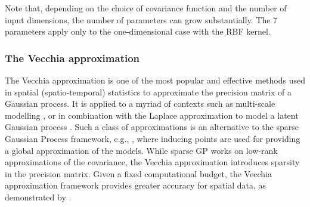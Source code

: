 \documentclass[12pt]{article}
\begin{document}
\noindent
\hangindent=-5mm
Note that, depending on the choice of covariance function and the number of input dimensions, the number of parameters can grow substantially. The 7 parameters apply only to the one-dimensional case with the RBF kernel.

\subsubsection{The Vecchia approximation}
The Vecchia approximation \citep{Vecchia1988estimation, datta2016hierarchical,katzfuss2021general} is one of the most popular and effective \citep{rambelli2025accuracy} methods used in spatial (spatio-temporal) statistics to approximate the precision matrix of a Gaussian process. It is applied to a myriad of contexts such as multi-scale modelling \citep{zhang2022multi}, or in combination with the Laplace approximation to model a latent Gaussian process  \citep{kundig2024iterative}.  Such a class of approximations is an alternative to the sparse Gaussian Process framework, e.g., \cite{lalchand2022sparse}, where inducing points are used for providing a global approximation of the models. While sparse GP works on low-rank approximations of the covariance, the Vecchia approximation introduces sparsity in the precision matrix. Given a fixed computational budget, the Vecchia approximation framework provides greater accuracy for spatial data, as demonstrated by \cite{rambelli2025accuracy}.
\end{document}
